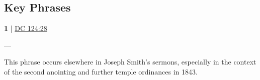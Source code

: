 		
\subsection{Key Phrases} %
	\label{PRIESTHOOD-PHRASES}

	\begin{compactdesc}
		
		\item[fulness of (the) priesthood] \textbf{1} | \hyperref[DC124-28]{DC 124:28}
			\begin{compactdesc}
				\item[Bible anchor verses] ---
				\item[Commentary] This phrase occurs elsewhere in Joseph Smith's sermons, especially in the context of the second anointing and further temple ordinances in 1843.
			\end{compactdesc}
		
			
			
	\end{compactdesc}
	
